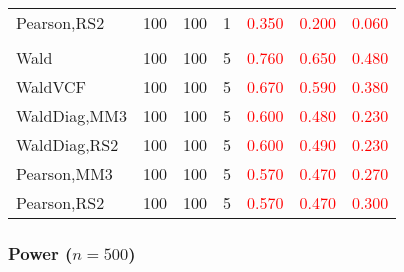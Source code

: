 \documentclass[
]{article}
\begin{document}
\begin{table}[H]
{\begin{tabular}[t]{lrrrrrr}
\hspace{1em}Pearson,RS2 & 100 & 100 & 1 & \textcolor{red}{0.350} & \textcolor{red}{0.200} & \textcolor{red}{0.060}\\
\addlinespace[0.3em]
\multicolumn{7}{l}{\textbf{3F 15V}}\\
\hspace{1em}Wald & 100 & 100 & 5 & \textcolor{red}{0.760} & \textcolor{red}{0.650} & \textcolor{red}{0.480}\\
\hspace{1em}WaldVCF & 100 & 100 & 5 & \textcolor{red}{0.670} & \textcolor{red}{0.590} & \textcolor{red}{0.380}\\
\hspace{1em}WaldDiag,MM3 & 100 & 100 & 5 & \textcolor{red}{0.600} & \textcolor{red}{0.480} & \textcolor{red}{0.230}\\
\hspace{1em}WaldDiag,RS2 & 100 & 100 & 5 & \textcolor{red}{0.600} & \textcolor{red}{0.490} & \textcolor{red}{0.230}\\
\hspace{1em}Pearson,MM3 & 100 & 100 & 5 & \textcolor{red}{0.570} & \textcolor{red}{0.470} & \textcolor{red}{0.270}\\
\hspace{1em}Pearson,RS2 & 100 & 100 & 5 & \textcolor{red}{0.570} & \textcolor{red}{0.470} & \textcolor{red}{0.300}\\
\bottomrule
\end{tabular}}
\endgroup{}
\end{table}

\hypertarget{power-n500-3}{%
\subsubsection{\texorpdfstring{Power
(\(n=500\))}{Power (n=500)}}\label{power-n500-3}}
\end{document}
